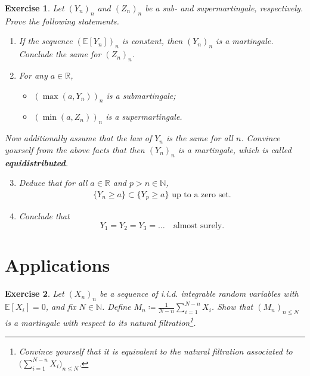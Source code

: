 \documentclass[12pt]{amsart}
\newtheorem{exo}{Exercise}
\numberwithin{equation}{section}
\newcommand{\R}{\mathbb R}
\newcommand{\N}{\mathbb N}
\newcommand{\E}{\mathbb E}
\renewcommand{\1}{\mathbf 1}
\begin{document}
\begin{exo}
    Let $(Y_n)_n$ and $(Z_n)_n$ be a sub- and supermartingale, respectively.
    Prove the following statements.
    \begin{enumerate}
        \item If the sequence $(\E[Y_n])_n$ is constant, then $(Y_n)_n$ is a martingale. Conclude the same for $(Z_n)_n$.
        \item For any $a \in \R$, 
        \begin{itemize}
            \item[$a)$] $(\max(a, Y_n))_n$ is a submartingale;
            \item[$b)$] $(\min(a, Z_n))_n$ is a supermartingale.
        \end{itemize}
    \end{enumerate}
    Now additionally assume that the law of $Y_n$ is the same for all $n$. Convince yourself from the above facts that then $(Y_n)_n$ is a martingale, which is called {\bfseries equidistributed}.
    \begin{enumerate}
    \setcounter{enumi}{2}
        \item Deduce that for all $a \in \R$ and $p > n \in \N$,
        \begin{align*}
            \{Y_n \geq a\} \subset \{Y_p \geq a\} \text{ up to a zero set}.
        \end{align*}
        \item Conclude that  
        \begin{equation*}
            Y_1 = Y_2 = Y_3 = \ldots \quad\text{almost surely}.
        \end{equation*}
    \end{enumerate}
\end{exo}



\section{Applications}

\begin{exo}
    Let $(X_n)_n$ be a sequence of \textit{i.i.d.} integrable random variables with $\E[X_i]=0$, and fix $N\in\N$. Define $M_n \coloneqq \frac{1}{N-n} \sum_{i=1}^{N-n} X_i$. Show that $(M_n)_{n\leq N}$ is a martingale with respect to its natural filtration\footnote{Convince yourself that it is equivalent to the natural filtration associated to $\big( \sum_{i=1}^{N-n} X_i\big)_{n \leq N}$.}.
\end{exo}
\end{document}
